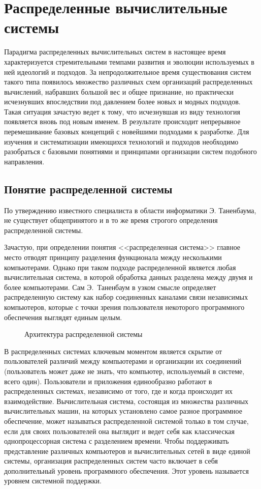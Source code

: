 \section{Распределенные вычислительные системы}
Парадигма распределенных вычислительных систем в настоящее время характеризуется стремительными темпами развития и эволюции используемых в ней идеологий и подходов. За непродолжительное время существования систем такого типа появилось множество различных схем организаций распределенных вычислений, набравших большой вес и общее признание, но практически исчезнувших впоследствии под давлением более новых и модных подходов. Такая ситуация зачастую ведет к тому, что исчезнувшая из виду технология появляется вновь под новым именем. В результате происходит непрерывное перемешивание базовых концепций с новейшими подходами к разработке. Для изучения и систематизации имеющихся технологий и подходов необходимо разобраться с базовыми понятиями и принципами организации систем подобного направления. 

\subsection{Понятие распределенной системы}
По утверждению известного специалиста в области информатики Э. Таненбаума, не существует общепринятого и в то же время строгого определения распределенной системы. 

Зачастую, при определении понятия <<распределенная система>> главное место отводят принципу разделения функционала между несколькими компьютерами. Однако при таком подходе распределенной является любая вычислительная система, в которой обработка данных разделена между двумя и более компьютерами. Сам Э.~Таненбаум в узком смысле определяет распределенную систему как набор соединенных каналами связи независимых компьютеров, которые с точки зрения пользователя некоторого программного обеспечения выглядят единым целым.

\begin{figure}[h]
\caption{Архитектура распределенной системы}
\label{0:dcs}
\end{figure}

В распределенных системах ключевым моментом является скрытие от пользователей различий между компьютерами и организации их соединений (пользователь может даже не знать, что компьютер, используемый в системе, всего один). Пользователи и приложения единообразно работают в распределенных системах, независимо от того, где и когда происходит их взаимодействие. Вычислительная система, состоящая из множества различных вычислительных машин, на которых установлено самое разное программное обеспечение, может называться распределенной системой только в том случае, если для своих пользователей она выглядит и ведет себя как классическая однопроцессорная система с разделением времени. Чтобы поддерживать представление различных компьютеров и вычислительных сетей в виде единой системы, организация распределенных систем часто включает в себя дополнительный уровень программного обеспечения. Этот уровень называется уровнем системной поддержки.

